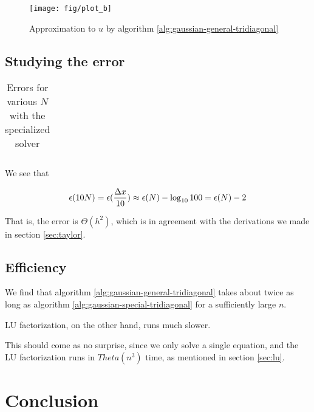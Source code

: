 \documentclass[a4paper]{article}
\begin{document}
\begin{figure}[ht]
\texttt{[image: fig/plot\_b]}
\caption{Approximation to $u$ by algorithm \ref{alg:gaussian-general-tridiagonal}}
\end{figure}

\subsection{Studying the error}

\begin{table}[htbp]
\begin{center}
\begin{tabular}{r r}
    
\end{tabular}
\caption{Errors for various $N$ with the specialized solver}
\end{center}
\end{table}

We see that

\begin{equation}
    \epsilon(10N) = \epsilon(\frac{{\Delta x}}{10}) \approx \epsilon(N) - \log_{10}{100} = \epsilon(N) - 2
\end{equation}

That is, the error is $\Theta(h^2)$, which is in agreement with the derivations we made in section \ref{sec:taylor}.

\subsection{Efficiency}
We find that algorithm \ref{alg:gaussian-general-tridiagonal} takes about twice as long as algorithm \ref{alg:gaussian-special-tridiagonal} for a sufficiently large $n$.

LU factorization, on the other hand, runs much slower.



This should come as no surprise, since we only solve a single equation, and the LU factorization runs in $Theta (n^3)$ time, as mentioned in section \ref{sec:lu}.

\section{Conclusion}\label{sec:conclusion}

%
%

{}
\end{document}
